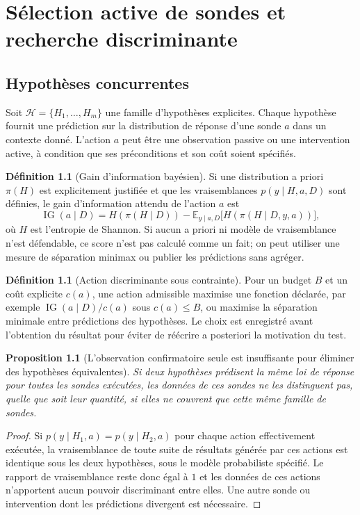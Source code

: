 \documentclass[11pt,oneside]{book}
\newtheorem{proposition}[theoreme]{Proposition}
\theoremstyle{definition}
\newtheorem{definition}[theoreme]{Définition}
\theoremstyle{remark}
\newcommand{\Hcal}{\mathcal H}
\newcommand{\Exp}{\mathbb E}
\newcommand{\1}{\mathbf 1}
\begin{document}
\chapter{Sélection active de sondes et recherche discriminante}
\section{Hypothèses concurrentes}
Soit $\Hcal=\{H_1,\ldots,H_m\}$ une famille d'hypothèses explicites. Chaque hypothèse fournit une prédiction sur la distribution de réponse d'une sonde $a$ dans un contexte donné. L'action $a$ peut être une observation passive ou une intervention active, à condition que ses préconditions et son coût soient spécifiés.

\begin{definition}[Gain d'information bayésien]
Si une distribution a priori $\pi(H)$ est explicitement justifiée et que les vraisemblances $p(y\mid H,a,D)$ sont définies, le gain d'information attendu de l'action $a$ est
\[
\operatorname{IG}(a\mid D)=H(\pi(H\mid D))-\Exp_{y\mid a,D}\bigl[H(\pi(H\mid D,y,a))\bigr],
\]
où $H$ est l'entropie de Shannon. Si aucun a priori ni modèle de vraisemblance n'est défendable, ce score n'est pas calculé comme un fait; on peut utiliser une mesure de séparation minimax ou publier les prédictions sans agréger.
\end{definition}

\begin{definition}[Action discriminante sous contrainte]
Pour un budget $B$ et un coût explicite $c(a)$, une action admissible maximise une fonction déclarée, par exemple $\operatorname{IG}(a\mid D)/c(a)$ sous $c(a)\leq B$, ou maximise la séparation minimale entre prédictions des hypothèses. Le choix est enregistré avant l'obtention du résultat pour éviter de réécrire a posteriori la motivation du test.
\end{definition}

\begin{proposition}[L'observation confirmatoire seule est insuffisante pour éliminer des hypothèses équivalentes]
Si deux hypothèses prédisent la même loi de réponse pour toutes les sondes exécutées, les données de ces sondes ne les distinguent pas, quelle que soit leur quantité, si elles ne couvrent que cette même famille de sondes.
\end{proposition}
\begin{proof}
Si $p(y\mid H_1,a)=p(y\mid H_2,a)$ pour chaque action effectivement exécutée, la vraisemblance de toute suite de résultats générée par ces actions est identique sous les deux hypothèses, sous le modèle probabiliste spécifié. Le rapport de vraisemblance reste donc égal à $1$ et les données de ces actions n'apportent aucun pouvoir discriminant entre elles. Une autre sonde ou intervention dont les prédictions divergent est nécessaire.
\end{proof}
\end{document}
